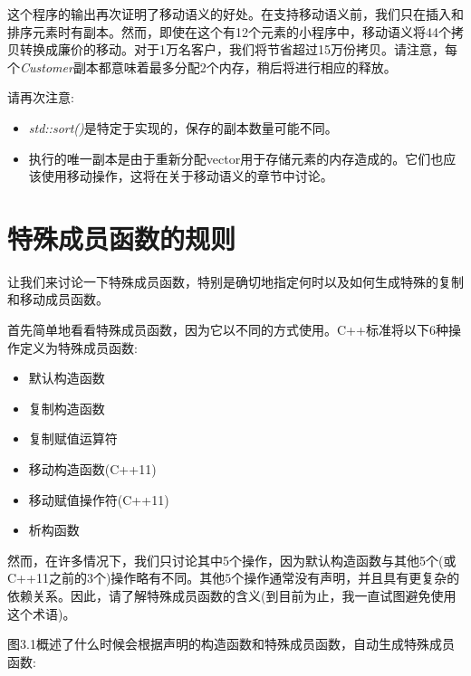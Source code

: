 
这个程序的输出再次证明了移动语义的好处。在支持移动语义前，我们只在插入和排序元素时有副本。然而，即使在这个有12个元素的小程序中，移动语义将44个拷贝转换成廉价的移动。对于1万名客户，我们将节省超过15万份拷贝。请注意，每个\textit{Customer}副本都意味着最多分配2个内存，稍后将进行相应的释放。\par

请再次注意:\par

\begin{itemize}
  \item \textit{std::sort()}是特定于实现的，保存的副本数量可能不同。
  \item 执行的唯一副本是由于重新分配vector用于存储元素的内存造成的。它们也应该使用移动操作，这将在关于移动语义的章节中讨论。
\end{itemize}


\section{特殊成员函数的规则}

让我们来讨论一下特殊成员函数，特别是确切地指定何时以及如何生成特殊的复制和移动成员函数。\par


首先简单地看看特殊成员函数，因为它以不同的方式使用。C++标准将以下6种操作定义为特殊成员函数:\par

\begin{itemize}
  \item 默认构造函数
  \item 复制构造函数
  \item 复制赋值运算符
  \item 移动构造函数(C++11)
  \item 移动赋值操作符(C++11)
  \item 析构函数
\end{itemize}

然而，在许多情况下，我们只讨论其中5个操作，因为默认构造函数与其他5个(或C++11之前的3个)操作略有不同。其他5个操作通常没有声明，并且具有更复杂的依赖关系。因此，请了解特殊成员函数的含义(到目前为止，我一直试图避免使用这个术语)。\par

图3.1概述了什么时候会根据声明的构造函数和特殊成员函数，自动生成特殊成员函数:\par

